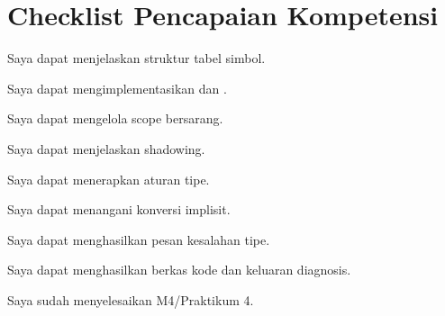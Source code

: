 \section*{Checklist Pencapaian Kompetensi}

\begin{checklist}
  \item Saya dapat menjelaskan struktur tabel simbol.
  \item Saya dapat mengimplementasikan  dan
        .
  \item Saya dapat mengelola scope bersarang.
  \item Saya dapat menjelaskan shadowing.
  \item Saya dapat menerapkan aturan tipe.
  \item Saya dapat menangani konversi implisit.
  \item Saya dapat menghasilkan pesan kesalahan tipe.
  \item Saya dapat menghasilkan berkas kode dan keluaran diagnosis.
  \item Saya sudah menyelesaikan M4/Praktikum 4.
\end{checklist}
